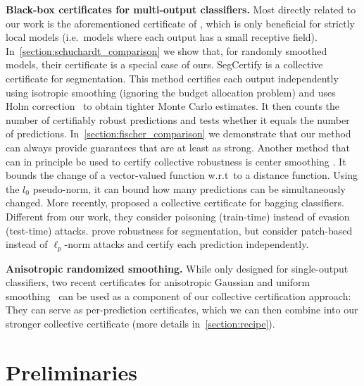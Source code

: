 \documentclass{article} %
\theoremstyle{plain}
\theoremstyle{definition}
\theoremstyle{remark}
\begin{document}
\textbf{Black-box certificates for multi-output classifiers.} 
Most directly related to our work is the aforementioned certificate of \citet{Schuchardt2021}, which is only beneficial for strictly local models (i.e.~models where each output has a small receptive field).
In~\autoref{section:schuchardt_comparison} we show that, for randomly smoothed models, their certificate is a special case of ours.
SegCertify \citep{Fischer2021} is a collective certificate for segmentation.
This method certifies each output independently using isotropic smoothing (ignoring the budget allocation problem) and uses Holm correction~\citep{Holm1979} to obtain tighter Monte Carlo estimates.
It then counts the number of certifiably robust predictions and tests whether it equals the number of predictions.
In~\autoref{section:fischer_comparison} we demonstrate that our method can always provide guarantees that are at least as strong.
Another method that
can in principle be used to certify collective robustness 
is center smoothing \citep{Kumar2021}.
It bounds the change of a vector-valued function w.r.t\ to a distance function. 
Using the $l_0$ pseudo-norm, it can bound how many predictions can be simultaneously changed.
More recently, \citet{Chen2022} proposed a collective certificate for bagging classifiers. Different from our work, they consider poisoning (train-time) instead of evasion (test-time) attacks.
\citet{Yatsura2022} prove robustness for segmentation, but consider patch-based instead of $\ell_p$-norm attacks and certify each prediction independently.

\textbf{Anisotropic randomized smoothing.} While only designed for single-output classifiers, two recent certificates for anisotropic  Gaussian and uniform smoothing~\citep{Fischer2020,Eiras2021}
can be used as a component of our collective certification approach:
They can serve as per-prediction certificates, which we can then combine into our stronger collective certificate
(more details in~\autoref{section:recipe}).

\section{Preliminaries}\label{section:preliminaries}
\end{document}
